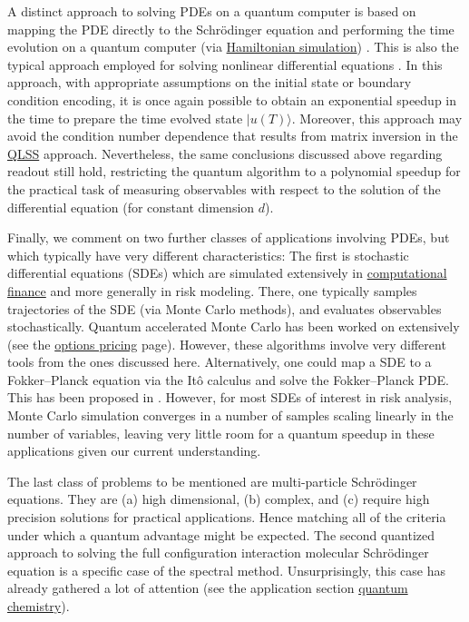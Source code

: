 \begin{refsection}
A distinct approach to solving PDEs on a quantum computer is based on mapping the PDE directly to the Schr\"odinger equation and performing the time evolution on a quantum computer (via \hyperref[prim:HamiltonianSimulation]{Hamiltonian simulation}) \cite{fang2022time, babbush2023exponential}. This is also the typical approach employed for solving nonlinear differential equations \cite{leyton2008quantum,lloyd2020quantum,liu2021dissipativeNonlinearEqs,an2022efficient,krovi2023improved}. In this approach, with appropriate assumptions on the initial state or boundary condition encoding, it is once again possible to obtain an exponential speedup in the time to prepare the time evolved state $|u(T)\rangle$. Moreover, this approach may avoid the condition number dependence that results from matrix inversion in the \hyperref[prim:QuantumLinearSystemSolvers]{QLSS} approach. Nevertheless, the same conclusions discussed above regarding readout still hold, restricting the quantum algorithm to a polynomial speedup for the practical task of measuring observables with respect to the solution of the differential equation (for constant dimension $d$).


Finally, we comment on two further classes of applications involving PDEs, but which typically have very different characteristics: The first is stochastic differential equations (SDEs) which are simulated extensively in \hyperref[appl:finance]{computational finance}  and more generally in risk modeling. There, one typically samples trajectories of the SDE (via Monte Carlo methods), and evaluates observables stochastically. Quantum accelerated Monte Carlo has been worked on extensively (see the \hyperref[appl:OptionsPricing]{options pricing} page). However, these algorithms involve very different tools from the ones discussed here. Alternatively, one could map a SDE to a Fokker--Planck equation via the It\^o calculus and solve the Fokker--Planck PDE. This has been proposed in \cite{gonzalez2021simulating}.  However, for most SDEs of interest in risk analysis, Monte Carlo simulation converges in a number of samples scaling linearly in the  number of variables, leaving very little room for a quantum speedup in these applications given our current understanding.



The last class of problems to be mentioned are multi-particle Schr\"odinger equations. They are (a) high dimensional, (b) complex, and (c) require high precision solutions for practical applications. Hence matching all of the criteria under which a quantum advantage might be expected. The second quantized approach to solving the full configuration interaction molecular   Schr\"odinger equation is a specific case of the spectral method. Unsurprisingly, this case has already gathered a lot of attention (see the application section \hyperref[appl:QuantumChemistry]{quantum chemistry}).







\end{refsection}
